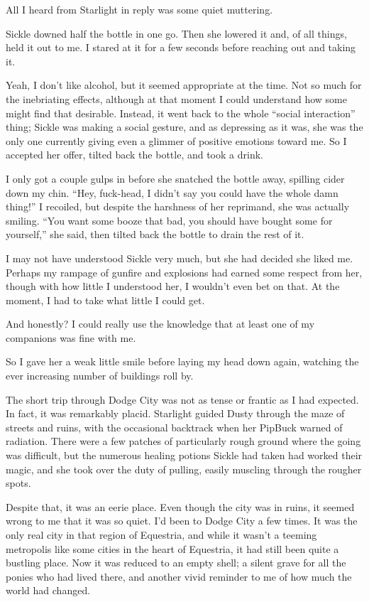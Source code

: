 All I heard from Starlight in reply was some quiet muttering.

Sickle downed half the bottle in one go. Then she lowered it and, of all things, held it out to me. I stared at it for a few seconds before reaching out and taking it.

Yeah, I don’t like alcohol, but it seemed appropriate at the time. Not so much for the inebriating effects, although at that moment I could understand how some might find that desirable. Instead, it went back to the whole “social interaction” thing; Sickle was making a social gesture, and as depressing as it was, she was the only one currently giving even a glimmer of positive emotions toward me. So I accepted her offer, tilted back the bottle, and took a drink.

I only got a couple gulps in before she snatched the bottle away, spilling cider down my chin. “Hey, fuck-head, I didn’t say you could have the whole damn thing!” I recoiled, but despite the harshness of her reprimand, she was actually smiling. “You want some booze that bad, you should have bought some for yourself,” she said, then tilted back the bottle to drain the rest of it.

I may not have understood Sickle very much, but she had decided she liked me. Perhaps my rampage of gunfire and explosions had earned some respect from her, though with how little I understood her, I wouldn’t even bet on that. At the moment, I had to take what little I could get.

And honestly? I could really use the knowledge that at least one of my companions was fine with me.

So I gave her a weak little smile before laying my head down again, watching the ever increasing number of buildings roll by.

{\br}%
The short trip through Dodge City was not as tense or frantic as I had expected. In fact, it was remarkably placid. Starlight guided Dusty through the maze of streets and ruins, with the occasional backtrack when her PipBuck warned of radiation. There were a few patches of particularly rough ground where the going was difficult, but the numerous healing potions Sickle had taken had worked their magic, and she took over the duty of pulling, easily muscling through the rougher spots.

Despite that, it was an eerie place. Even though the city was in ruins, it seemed wrong to me that it was so quiet. I’d been to Dodge City a few times. It was the only real city in that region of Equestria, and while it wasn’t a teeming metropolis like some cities in the heart of Equestria, it had still been quite a bustling place. Now it was reduced to an empty shell; a silent grave for all the ponies who had lived there, and another vivid reminder to me of how much the world had changed.

